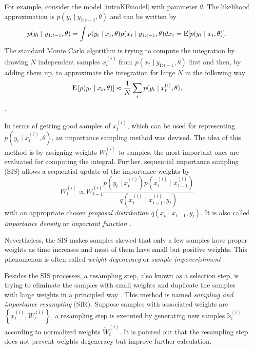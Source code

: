 For example, consider the model \eqref{introKFmodel} with parameter $\theta$. The likelihood approximation is $p(y_t\mid y_{1:t-1},\theta)$ and can be written by
\begin{equation*}
p(y_t\mid y_{1:t-1},\theta) = \int p(y_t\mid x_t,\theta)p(x_t\mid y_{1:t-1},\theta) dx_t = \mathrm{E} \lbrack p(y_t\mid x_t,\theta)\rbrack.
\end{equation*}
The standard Monte Carlo algorithm is trying to compute the integration by drawing $N$ independent samples $x_t^{(i)}$ from $p(x_t\mid y_{1:t-1},\theta)$ first and then, by adding them up, to approximate the integration for large $N$ in the following way 
\begin{equation*}
\mathrm{E}\left[p(y_t\mid x_t,\theta)\right]\approx \frac{1}{N}\sum_i p(y_t\mid x_t^{(i)},\theta), 
\end{equation*}
\citep{kalos2008monte}.

In terms of getting good samples of $x_t^{(i)}$, which can be used for representing $p(y_t\mid x_t^{(i)},\theta)$, an importance sampling method was devised. The idea of this method is by assigning weights $W_t^{(i)}$ to samples, the most important ones are evaluated for computing the integral. Further, sequential importance sampling (SIS) allows a sequential update of the importance weights by 
\begin{equation*}
W_t^{(i)} \propto W_{t-1}^{(i)} \frac{ p\left(y_t \mid x_t^{(i)}\right) p\left(x_{t}^{(i)}\mid x_{t-1}^{(i)}\right) }{q\left(x_{t}^{(i)}\mid x_{t-1}^{(i)},y_{t}\right)}
\end{equation*}
with an appropriate chosen \textit{proposal distribution} $q(x_{t}\mid  x_{t-1},y_{t})$. It is also called \textit{importance density} or \textit{important function}  \citep{chen2003bayesian}. 


Nevertheless, the SIS makes samples skewed that only a few samples have proper weights as time increases and most of them have small but positive weights. This phenomenon is often called \textit{weight degeneracy} or \textit{sample impoverishment} \citep{green1995reversible, berzuini1997dynamic}. 


Besides the SIS processes, a resampling step, also known as a selection step, is trying to eliminate the samples with small weights and duplicate the samples with large weights in a principled way \citep{rubin2004multiple, tanner1987calculation}. This method is named \textit{sampling and importance resampling} (SIR). Suppose samples with associated weights are $\left\lbrace x_t^{(i)},W_t^{(i)}\right\rbrace$, a resampling step is executed by generating new samples $\tilde{x}_t^{(i)}$ according to normalized weights $\tilde{W}_t^{(i)}$. It is pointed out that the resampling step does not prevent weights degeneracy but improve further calculation. 

